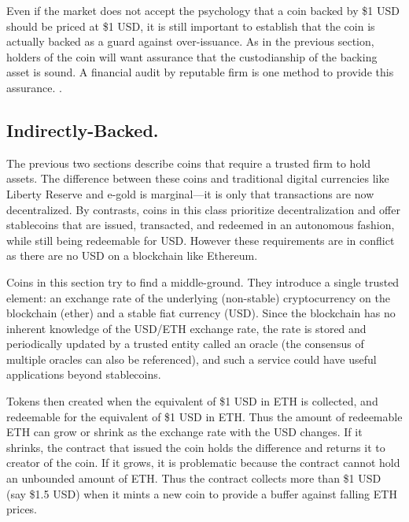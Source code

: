 
Even if the market does not accept the psychology that a coin backed by \$1 USD should be priced at \$1 USD, it is still important to establish that the coin is actually backed as a guard against over-issuance. As in the previous section, holders of the coin will want assurance that the custodianship of the backing asset is sound. A financial audit by reputable firm is one method to provide this assurance. .



\subsection{Indirectly-Backed.}
\label{sec:dai}

The previous two sections describe coins that require a trusted firm to hold assets. The difference between these coins and traditional digital currencies like Liberty Reserve and e-gold is marginal---it is only that transactions are now decentralized. By contrasts, coins in this class prioritize decentralization and offer stablecoins that are issued, transacted, and redeemed in an autonomous fashion, while still being redeemable for USD. However these requirements are in conflict as there are no USD on a blockchain like Ethereum.

Coins in this section try to find a middle-ground. They introduce a single trusted element: an exchange rate of the underlying (non-stable) cryptocurrency on the blockchain (\eg ether) and a stable fiat currency (\eg USD). Since the blockchain has no inherent knowledge of the USD/ETH exchange rate, the rate is stored and periodically updated by a trusted entity called an oracle (the consensus of multiple oracles can also be referenced), and such a service could have useful applications beyond stablecoins.

Tokens then created when the equivalent of \$1 USD in ETH is collected, and redeemable for the equivalent of \$1 USD in ETH. Thus the amount of redeemable ETH can grow or shrink as the exchange rate with the USD changes. If it shrinks, the contract that issued the coin holds the difference and returns it to creator of the coin. If it grows, it is problematic because the contract cannot hold an unbounded amount of ETH. Thus the contract collects more than \$1 USD (say \$1.5 USD) when it mints a new coin to provide a buffer against falling ETH prices.

